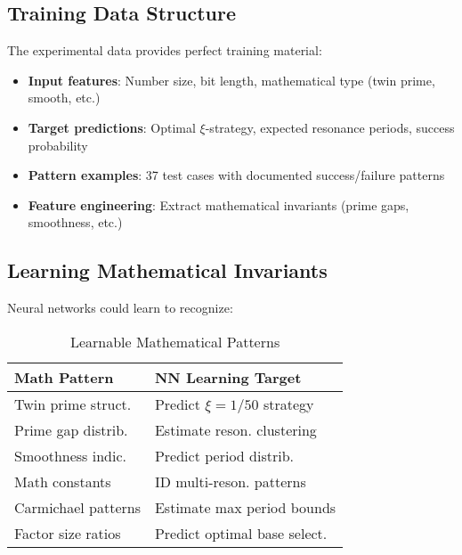 \documentclass[12pt,a4paper]{article}
\begin{document}
	\subsection{Training Data Structure}
	
	The experimental data provides perfect training material:
	
	\begin{itemize}
		\item \textbf{Input features}: Number size, bit length, mathematical type (twin prime, smooth, etc.)
		\item \textbf{Target predictions}: Optimal $\xi$-strategy, expected resonance periods, success probability
		\item \textbf{Pattern examples}: 37 test cases with documented success/failure patterns
		\item \textbf{Feature engineering}: Extract mathematical invariants (prime gaps, smoothness, etc.)
	\end{itemize}
	
	\subsection{Learning Mathematical Invariants}
	
	Neural networks could learn to recognize:
	
	\begin{table}[H]
		\centering
		\caption{Learnable Mathematical Patterns}
		\begin{tabular}{ll}
			\toprule
			\textbf{Math Pattern} & \textbf{NN Learning Target} \\
			\midrule
			Twin prime struct. & Predict $\xi = 1/50$ strategy \\
			Prime gap distrib. & Estimate reson. clustering \\
			Smoothness indic. & Predict period distrib. \\
			Math constants & ID multi-reson. patterns \\
			Carmichael patterns & Estimate max period bounds \\
			Factor size ratios & Predict optimal base select. \\
			\bottomrule
		\end{tabular}
		\label{tab:learnable_patterns}
	\end{table}
	
	
	
\end{document}
